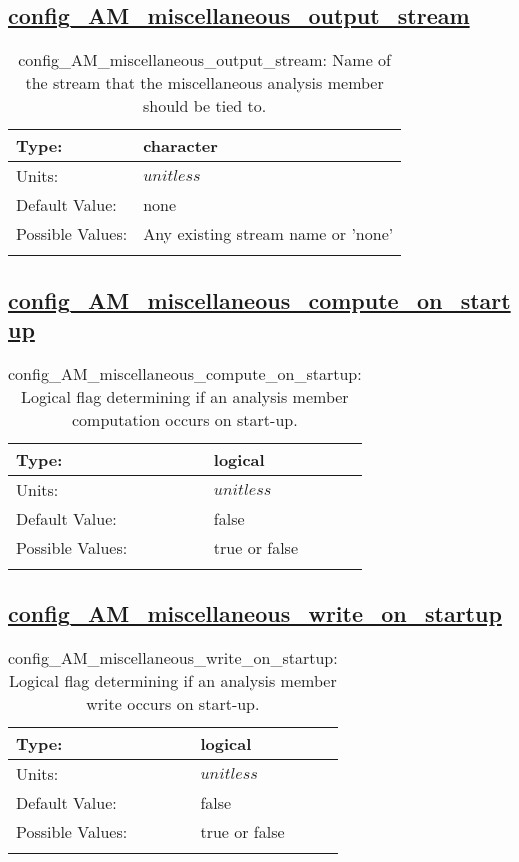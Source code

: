 \subsection[config\_AM\_miscellaneous\_output\_stream]{\hyperref[sec:nm_tab_AM_miscellaneous]{config\_AM\_miscellaneous\_output\_stream}}
\label{subsec:nm_sec_config_AM_miscellaneous_output_stream}
\begin{center}
\begin{longtable}{| p{2.0in} || p{4.0in} |}
    \hline
    Type: & character \\
    \hline
    Units: & $unitless$ \\
    \hline
    Default Value: & none \\
    \hline
    Possible Values: & Any existing stream name or 'none' \\
    \hline
    \caption{config\_AM\_miscellaneous\_output\_stream: Name of the stream that the miscellaneous analysis member should be tied to.}
\end{longtable}
\end{center}
\subsection[config\_AM\_miscellaneous\_compute\_on\_startup]{\hyperref[sec:nm_tab_AM_miscellaneous]{config\_AM\_miscellaneous\_compute\_on\_startup}}
\label{subsec:nm_sec_config_AM_miscellaneous_compute_on_startup}
\begin{center}
\begin{longtable}{| p{2.0in} || p{4.0in} |}
    \hline
    Type: & logical \\
    \hline
    Units: & $unitless$ \\
    \hline
    Default Value: & false \\
    \hline
    Possible Values: & true or false \\
    \hline
    \caption{config\_AM\_miscellaneous\_compute\_on\_startup: Logical flag determining if an analysis member computation occurs on start-up.}
\end{longtable}
\end{center}
\subsection[config\_AM\_miscellaneous\_write\_on\_startup]{\hyperref[sec:nm_tab_AM_miscellaneous]{config\_AM\_miscellaneous\_write\_on\_startup}}
\label{subsec:nm_sec_config_AM_miscellaneous_write_on_startup}
\begin{center}
\begin{longtable}{| p{2.0in} || p{4.0in} |}
    \hline
    Type: & logical \\
    \hline
    Units: & $unitless$ \\
    \hline
    Default Value: & false \\
    \hline
    Possible Values: & true or false \\
    \hline
    \caption{config\_AM\_miscellaneous\_write\_on\_startup: Logical flag determining if an analysis member write occurs on start-up.}
\end{longtable}
\end{center}

